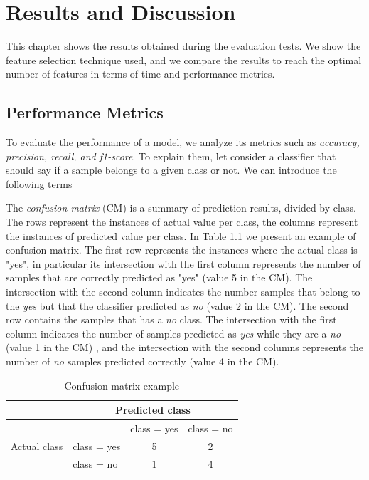 \chapter{Results and Discussion}
\label{ch:disc}

This chapter shows the results obtained during the evaluation tests. We show the feature selection technique used, and we compare the results to reach the optimal number of features in terms of time and performance metrics.

\section{Performance Metrics}

To evaluate the performance of a model, we analyze its metrics such as \textit{accuracy, precision, recall, and f1-score}. To explain them, let consider a classifier that should say if a sample belongs to a given class or not. We can introduce the following terms

The \textit{confusion matrix} (CM) is a summary of prediction results, divided by class. The rows represent the instances of actual value per class, the columns represent the instances of predicted value per class. In Table \ref{tab:cm} we present an example of confusion matrix. The first row represents the instances where the actual class is "yes", in particular its intersection with the first column represents the number of samples that are correctly predicted as "yes" (value 5 in the CM). The intersection with the second
column indicates the number samples that belong to the \textit{yes} but that the classifier predicted as \textit{no} (value 2 in the CM). The second row contains the samples that has a \textit{no} class. The intersection with the first column indicates the number of samples predicted as \textit{yes} while they are a \textit{no} (value 1 in the CM) , and the intersection with the second columns represents the number of \textit{no} samples predicted correctly (value 4 in the CM).
\begin{table}[h]
	\centering
	\caption{Confusion matrix example}
	\label{tab:cm}
	\begin{tabular}{|l|l|c|c|}
		\hline
		& \multicolumn{3}{c|}{Predicted class}                                             \\ \hline
		\multirow{3}{*}{Actual class} &             & \multicolumn{1}{l|}{class = yes} & \multicolumn{1}{l|}{class = no} \\ \cline{2-4} 
		& class = yes & 5                                & 2                               \\ \cline{2-4} 
		& class = no  & 1                                & 4                               \\ \hline
	\end{tabular}
\end{table}

